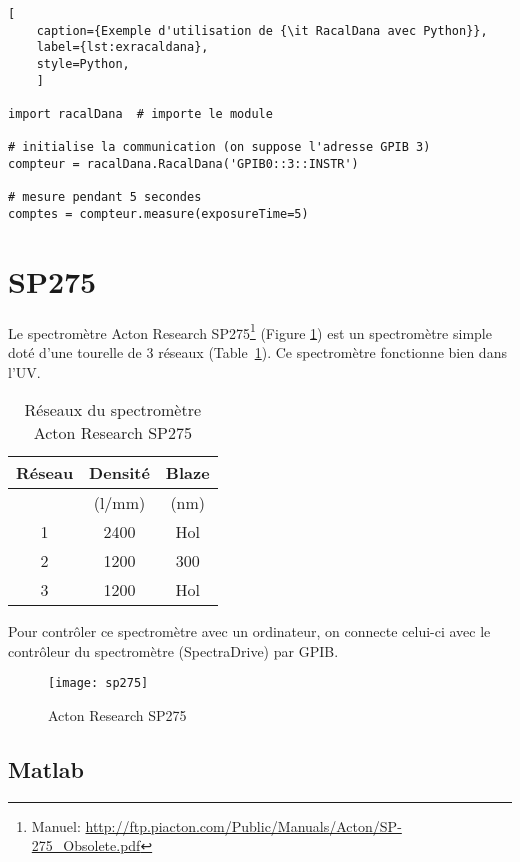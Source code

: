 \documentclass[11pt,francais]{book} %
\begin{document}
\begin{lstlisting}[
    caption={Exemple d'utilisation de {\it RacalDana avec Python}},
    label={lst:exracaldana},
    style=Python,
    ]  
 
import racalDana  # importe le module

# initialise la communication (on suppose l'adresse GPIB 3)
compteur = racalDana.RacalDana('GPIB0::3::INSTR') 

# mesure pendant 5 secondes
comptes = compteur.measure(exposureTime=5)
\end{lstlisting}


\section{SP275}

Le spectromètre Acton Research SP275\footnote{Manuel: \url{http://ftp.piacton.com/Public/Manuals/Acton/SP-275_Obsolete.pdf}} (Figure \ref{fig:sp275}) est un spectromètre simple doté d'une tourelle de 3 réseaux (Table~\ref{table:reseauxSP275}).
Ce spectromètre fonctionne bien dans l'UV.

\begin{table}[htbp]
  \caption{Réseaux du spectromètre Acton Research SP275}
  \label{table:reseauxSP275}
  \centering
    \begin{tabular}{ccc}
    Réseau & Densité    & Blaze \\ \hline
    ~      & (l/mm)     & (nm)  \\
    1      & 2400       & Hol     \\
    2      & 1200       & 300     \\
    3      & 1200       & Hol     \\
    \end{tabular}
\end{table}

Pour contrôler ce spectromètre avec un ordinateur, on connecte celui-ci avec le contrôleur du spectromètre (SpectraDrive) par GPIB.

\begin{figure}[htbp]
\centering\texttt{[image: sp275]}
\caption{Acton Research SP275}
\label{fig:sp275}
\end{figure}

\subsection{Matlab}
\end{document}
